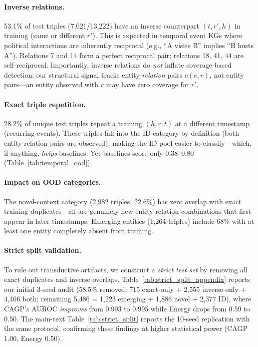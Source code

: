 \documentclass{article}
\begin{document}
\paragraph{Inverse relations.}
53.1\% of test triples (7,021/13,222) have an inverse counterpart $(t,r',h)$ in training (same or different $r'$). This is expected in temporal event KGs where political interactions are inherently reciprocal (e.g., ``A visits B'' implies ``B hosts A''). Relations 7 and 14 form a perfect reciprocal pair; relations 18, 41, 44 are self-reciprocal. Importantly, inverse relations do \emph{not} inflate coverage-based detection: our structural signal tracks entity-\emph{relation} pairs $c(e,r)$, not entity pairs---an entity observed with $r$ may have zero coverage for $r'$.

\paragraph{Exact triple repetition.}
28.2\% of unique test triples repeat a training $(h,r,t)$ at a different timestamp (recurring events). These triples fall into the ID category by definition (both entity-relation pairs are observed), making the ID pool easier to classify---which, if anything, \emph{helps} baselines. Yet baselines score only 0.38--0.80 (Table~\ref{tab:temporal_ood}).

\paragraph{Impact on OOD categories.}
The novel-context category (2,982 triples, 22.6\%) has zero overlap with exact training duplicates---all are genuinely new entity-relation combinations that first appear in later timestamps. Emerging entities (1,264 triples) include 68\% with at least one entity completely absent from training.

\paragraph{Strict split validation.}
To rule out transductive artifacts, we construct a \emph{strict test set} by removing all exact duplicates and inverse overlaps. Table~\ref{tab:strict_split_appendix} reports our initial 3-seed audit (58.5\% removed: 715 exact-only + 2,555 inverse-only + 4,466 both; remaining 5,486 = 1,223 emerging + 1,886 novel + 2,377 ID), where CAGP's AUROC \emph{improves} from 0.993 to 0.995 while Energy drops from 0.59 to 0.50. The main-text Table~\ref{tab:strict_split} reports the 10-seed replication with the same protocol, confirming these findings at higher statistical power (CAGP 1.00, Energy 0.50).
\end{document}
